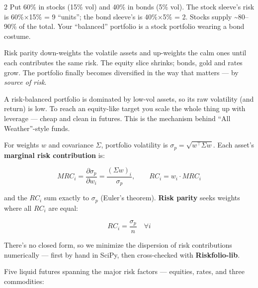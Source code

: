 \documentclass{pyportfolios-note}
\begin{document}
\begin{multicols}{2}
Put 60\% in stocks (15\% vol) and 40\% in bonds (5\% vol). The stock sleeve's
risk is 60\%×15\% = 9 ``units''; the bond sleeve's is 40\%×5\% = 2. Stocks
supply \textasciitilde80–90\% of the total. Your ``balanced'' portfolio is a
stock portfolio wearing a bond costume.

Risk parity down-weights the volatile assets and up-weights the calm ones until
each contributes the same risk. The equity slice shrinks; bonds, gold and rates
grow. The portfolio finally becomes diversified in the way that matters — by
\textit{source of risk}.

A risk-balanced portfolio is dominated by low-vol assets, so its raw volatility
(and return) is low. To reach an equity-like target you scale the whole thing up
with leverage — cheap and clean in futures. This is the mechanism behind ``All
Weather''-style funds.
\end{multicols}

\noteneedroom{180bp}

For weights $w$ and covariance $\Sigma$, portfolio volatility is
$\sigma_p = \sqrt{w^\top\Sigma w}$. Each asset's \textbf{marginal risk
contribution} is:

\[ MRC_i = \frac{\partial \sigma_p}{\partial w_i} = \frac{(\Sigma w)_i}{\sigma_p},
   \qquad RC_i = w_i \cdot MRC_i \]

and the $RC_i$ sum exactly to $\sigma_p$ (Euler's theorem). \textbf{Risk parity}
seeks weights where all $RC_i$ are equal:

\[ RC_i = \frac{\sigma_p}{n} \quad \forall i \]

There's no closed form, so we minimize the dispersion of risk contributions
numerically — first by hand in SciPy, then cross-checked with
\textbf{Riskfolio-lib}.

\noteneedroom{200bp}


Five liquid futures spanning the major risk factors — equities, rates, and three
commodities:
\end{document}
